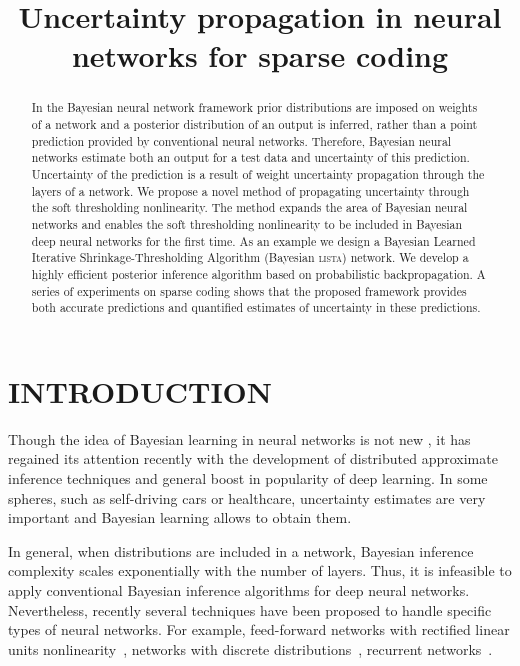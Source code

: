 \documentclass[letterpaper]{article}
\title{Uncertainty propagation in neural networks for sparse coding}
\author{} %
\begin{document}
\maketitle

\begin{abstract}
In the Bayesian neural network framework prior distributions are imposed on weights of a network and a posterior distribution of an output is inferred, rather than a point prediction provided by conventional neural networks. Therefore, Bayesian neural networks estimate both an output for a test data and uncertainty of this prediction. Uncertainty of the prediction is a result of weight uncertainty propagation through the layers of a network. We propose a novel method of propagating uncertainty through the soft thresholding nonlinearity. The method expands the area of Bayesian neural networks and enables the soft thresholding nonlinearity to be included in Bayesian deep neural networks for the first time. As an example we design a Bayesian Learned Iterative Shrinkage-Thresholding Algorithm (Bayesian \textsc{lista}) network. We develop a highly efficient posterior inference algorithm based on probabilistic backpropagation. A series of experiments on sparse coding shows that the proposed framework provides both accurate predictions and quantified estimates of uncertainty in these predictions.
\end{abstract}

\section{\uppercase{Introduction}}
Though the idea of Bayesian learning in neural networks is not new \citep{neal2012bayesian}, it has regained its attention recently with the development of distributed approximate inference techniques \citep{li2015stochastic, hoffman2013stochastic}  and general boost in popularity of deep learning. In some spheres, such as self-driving cars or healthcare, uncertainty estimates are very important and Bayesian learning allows to obtain them.

In general, when distributions are included in a network, Bayesian inference complexity scales exponentially with the number of layers. Thus, it is infeasible to apply conventional Bayesian inference algorithms for deep neural networks. Nevertheless, recently several techniques have been proposed to handle specific types of neural networks. For example, feed-forward networks with rectified linear units nonlinearity~\citep{hernandez2015probabilistic}, networks with discrete distributions~\citep{soudry2014expectation}, recurrent networks~\citep{mcdermott2017bayesian}.
\end{document}
